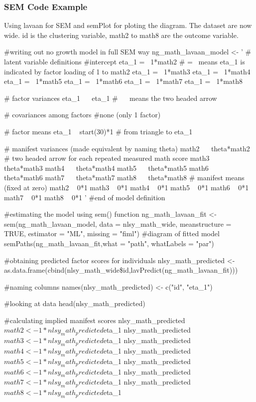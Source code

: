 \subsubsection{SEM Code Example} 
Using lavaan for SEM and semPlot for ploting the diagram. The dataset are now wide. id is the clustering variable, math2 to math8 are the outcome variable. 
\begin{R}
#writing out no growth model in full SEM way 
ng_math_lavaan_model <- ' 
  # latent variable definitions
      #intercept
      eta_1 =~ 1*math2  # =~ means eta_1 is indicated by factor loading of 1 to math2
      eta_1 =~ 1*math3
      eta_1 =~ 1*math4
      eta_1 =~ 1*math5
      eta_1 =~ 1*math6
      eta_1 =~ 1*math7
      eta_1 =~ 1*math8

  # factor variances
      eta_1 ~~ eta_1 # ~~ means the two headed arrow 

  # covariances among factors 
      #none (only 1 factor)

  # factor means 
      eta_1 ~ start(30)*1 # from triangle to eta_1 

  # manifest variances (made equivalent by naming theta)
      math2 ~~ theta*math2 # two headed arrow for each repeated measured math score 
      math3 ~~ theta*math3
      math4 ~~ theta*math4
      math5 ~~ theta*math5
      math6 ~~ theta*math6
      math7 ~~ theta*math7
      math8 ~~ theta*math8
  # manifest means (fixed at zero)
      math2 ~ 0*1
      math3 ~ 0*1
      math4 ~ 0*1
      math5 ~ 0*1
      math6 ~ 0*1
      math7 ~ 0*1
      math8 ~ 0*1
' #end of model definition

#estimating the model using sem() function
ng_math_lavaan_fit <- sem(ng_math_lavaan_model, 
                          data = nlsy_math_wide,
                          meanstructure = TRUE,
                          estimator = "ML",
                          missing = "fiml")
#diagram of fitted model
semPaths(ng_math_lavaan_fit,what = "path", whatLabels = "par")

#obtaining predicted factor scores for individuals
nlsy_math_predicted <- as.data.frame(cbind(nlsy_math_wide\$id,lavPredict(ng_math_lavaan_fit)))

#naming columns
names(nlsy_math_predicted) <- c("id", "eta_1")

#looking at data
head(nlsy_math_predicted) 

#calculating implied manifest scores
nlsy_math_predicted$math2 <- 1*nlsy_math_predicted$eta_1
nlsy_math_predicted$math3 <- 1*nlsy_math_predicted$eta_1
nlsy_math_predicted$math4 <- 1*nlsy_math_predicted$eta_1
nlsy_math_predicted$math5 <- 1*nlsy_math_predicted$eta_1
nlsy_math_predicted$math6 <- 1*nlsy_math_predicted$eta_1
nlsy_math_predicted$math7 <- 1*nlsy_math_predicted$eta_1
nlsy_math_predicted$math8 <- 1*nlsy_math_predicted$eta_1

\end{R}

